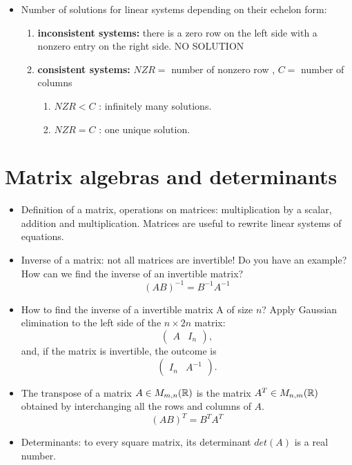 \begin{itemize}
\item Number of solutions for linear systems depending on their echelon form:
\begin{enumerate}
\item \textbf{inconsistent systems:} there is a zero row on the left side with a nonzero entry on the right side. NO SOLUTION
\item \textbf{consistent systems:} $NZR =$ number of nonzero row , $C =$ number of columns
\begin{enumerate}
\item $NZR < C$ : infinitely many solutions.  
\item $NZR = C$ : one unique solution.
\end{enumerate} 
\end{enumerate}
\end{itemize}

\section{Matrix algebras and determinants}

\begin{itemize}
\item Definition of a matrix, operations on matrices: multiplication by a scalar, addition and multiplication. Matrices are useful to rewrite linear systems of equations.
\item Inverse of a matrix: not all matrices are invertible! Do you have an example? How can we find the inverse of an invertible matrix?  
\[(AB)^{-1} = B^{-1}A^{-1}\]
\item How to find the inverse of a invertible matrix A of size $n$? Apply Gaussian elimination to the left side of the $n\times 2n$ matrix:
\[\begin{pmatrix}
A & I_n \end{pmatrix},\]
and, if the matrix is invertible, the outcome is
\[\begin{pmatrix}
I_n & A^{-1} \end{pmatrix}.\]
\item The transpose of a matrix $A\in M_{m,n}(\mathbb R)$ is the matrix $A^T\in M_{n,m}(\mathbb R)$ obtained by interchanging all the rows and columns of $A$.
\[(AB)^{T} = B^{T}A^{T}\]
\item Determinants: to every square matrix, its determinant $det(A)$ is a real number.
\end{itemize} 
